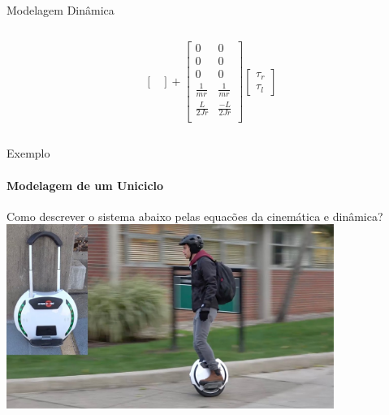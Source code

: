 \documentclass{beamer}
\begin{document}
\begin{frame}{Modelagem Dinâmica}
\begin{columns}
\begin{column}[c]{0.6\textwidth}
\begin{equation*}
\begin{bmatrix}
                \end{bmatrix} + 
                \begin{bmatrix}
                    0 & 0 \\
                    0 & 0 \\
                    0 & 0 \\
                    \frac{1}{mr} & \frac{1}{mr} \\
                    \frac{L}{2Jr} & \frac{-L}{2Jr} \\
                \end{bmatrix}
                \begin{bmatrix}
                    \tau_r \\ \tau_l
                \end{bmatrix}
            \end{equation*}
        \end{column}
    \end{columns}

\end{frame}

\begin{frame}[c]{Exemplo}
    \framesubtitle{Modelagem de um Uniciclo}
    Como descrever o sistema abaixo pelas equacões da cinemática e dinâmica?
    \centering
    \includegraphics[width=0.8\textwidth]{./images/unicycle.jpg}
\end{frame}
\end{document}
